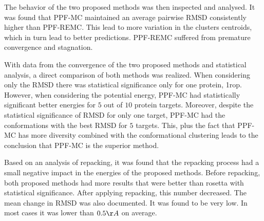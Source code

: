 The behavior of the two proposed methods was then inspected and analysed. It was
found that PPF-MC maintained an average pairwise RMSD consistently higher than PPF-REMC.
This lead to more variation in the clusters centroids, which in turn lead to
better predictions. PPF-REMC suffered from premature convergence and stagnation.

With data from the convergence of the two proposed methods and statistical
analysis, a direct comparison of both methods was realized. When considering
only the RMSD there was statistical significance only for one protein, 1rop.
However, when considering the potential energy, PPF-MC had statistically
significant better energies for $5$ out of $10$ protein targets. Moreover,
despite the statistical significance of RMSD for only one target, PPF-MC had
the conformations with the best RMSD for $5$ targets. This, plus the fact that
PPF-MC has more diversity combined with the conformational clustering leads to
the conclusion that PPF-MC is the superior method.

Based on an analysis of repacking, it was found that
the repacking process had a small negative impact in the energies of the
proposed methods. Before repacking, both proposed methods had more results that
were better than rosetta with statistical significance. After applying repacking,
this number decreased. The mean change in RMSD was also documented. It was found
to be very low. In most cases it was lower than $0.5\AA$ on average.

